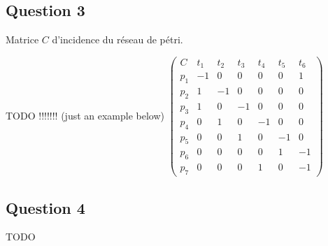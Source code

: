 \subsection*{Question 3}

Matrice $C$ d'incidence du réseau de pétri.

TODO !!!!!!! (just an example below)
 $ \begin{pmatrix}
C&t_1&t_2&t_3&t_4&t_5&t_6 \\
p_1& -1&0&0&0&0&1 \\
p_2&1&-1&0&0&0&0 \\
p_3&1&0&-1&0&0&0 \\
p_4&0&1&0&-1&0&0 \\
p_5&0&0&1&0&-1&0 \\
p_6&0&0&0&0&1&-1 \\
p_7&0&0&0&1&0&-1 
\end{pmatrix}$
\subsection*{Question 4}

TODO
